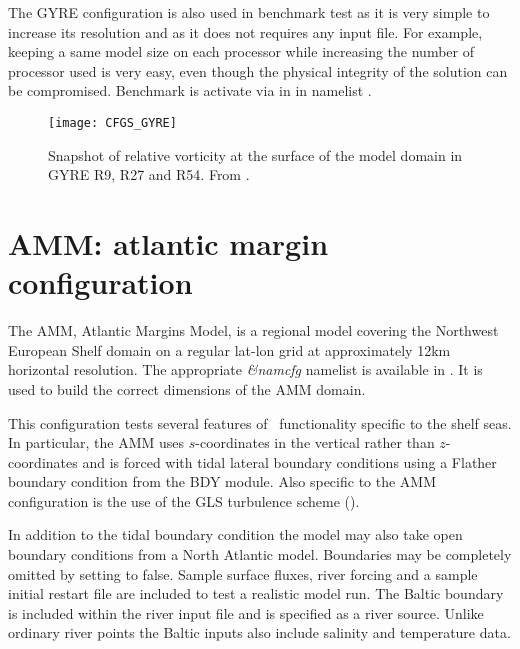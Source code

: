 \documentclass[../main/NEMO_manual]{subfiles}
\begin{document}
The GYRE configuration is also used in benchmark test as it is very simple to increase its resolution and
as it does not requires any input file.
For example, keeping a same model size on each processor while increasing the number of processor used is very easy,
even though the physical integrity of the solution can be compromised.
Benchmark is activate via  in  in
namelist .

\begin{figure}[!t]
  \centering
  \texttt{[image: CFGS\_GYRE]}
  \caption[Snapshot of relative vorticity at the surface of the model domain in GYRE R9, R27 and R54]{
    Snapshot of relative vorticity at the surface of the model domain in GYRE R9, R27 and R54.
    From \citet{levy.klein.ea_OM10}.}
  \label{fig:CFGS_GYRE}
\end{figure}

\section{AMM: atlantic margin configuration}
\label{sec:CFGS_config_AMM}

The AMM, Atlantic Margins Model, is a regional model covering the Northwest European Shelf domain on
a regular lat-lon grid at approximately 12km horizontal resolution.
The appropriate \textit{\&namcfg} namelist  is available in .
It is used to build the correct dimensions of the AMM domain.

This configuration tests several features of \NEMO\ functionality specific to the shelf seas.
In particular, the AMM uses $s$-coordinates in the vertical rather than $z$-coordinates and
is forced with tidal lateral boundary conditions using a Flather boundary condition from the BDY module.
Also specific to the AMM configuration is the use of the GLS turbulence scheme ().

In addition to the tidal boundary condition the model may also take open boundary conditions from
a North Atlantic model.
Boundaries may be completely omitted by setting  to false.
Sample surface fluxes, river forcing and a sample initial restart file are included to test a realistic model run.
The Baltic boundary is included within the river input file and is specified as a river source.
Unlike ordinary river points the Baltic inputs also include salinity and temperature data.

\subinc{}
\end{document}
